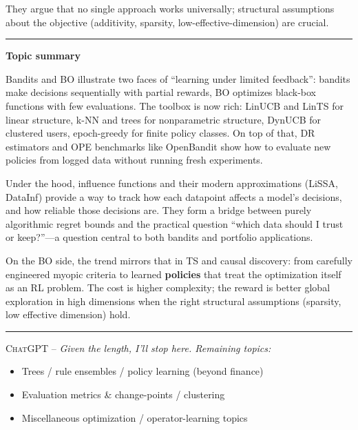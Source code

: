 \documentclass[a5paper]{article}
\providecommand{\tightlist}{%
  \setlength{\itemsep}{0pt}\setlength{\parskip}{0pt}}
\def\subsection#1{{\par\bigskip\goodbreak\large\bfseries #1\par}}
\begin{document}
They argue that no single approach works universally; structural
assumptions about the objective (additivity, sparsity,
low-effective-dimension) are crucial.

\begin{center}\rule{0.5\linewidth}{0.5pt}\end{center}

\subsection{Topic summary}\label{topic-summary-11}

Bandits and BO illustrate two faces of ``learning under limited
feedback'': bandits make decisions sequentially with partial rewards, BO
optimizes black-box functions with few evaluations. The toolbox is now
rich: LinUCB and LinTS for linear structure, k-NN and trees for
nonparametric structure, DynUCB for clustered users, epoch-greedy for
finite policy classes. On top of that, DR estimators and OPE benchmarks
like OpenBandit show how to evaluate new policies from logged data
without running fresh experiments.

Under the hood, influence functions and their modern approximations
(LiSSA, DataInf) provide a way to track how each datapoint affects a
model's decisions, and how reliable those decisions are. They form a
bridge between purely algorithmic regret bounds and the practical
question ``which data should I trust or keep?''---a question central to
both bandits and portfolio applications.

On the BO side, the trend mirrors that in TS and causal discovery: from
carefully engineered myopic criteria to learned \textbf{policies} that
treat the optimization itself as an RL problem. The cost is higher
complexity; the reward is better global exploration in high dimensions
when the right structural assumptions (sparsity, low effective
dimension) hold.

\begin{center}\rule{0.5\linewidth}{0.5pt}\end{center}

\textsc{ChatGPT --}
\itshape
Given the length, I'll stop here. Remaining topics:

\begin{itemize}
\tightlist
\item
  Trees / rule ensembles / policy learning (beyond finance)
\item
  Evaluation metrics \& change-points / clustering
\item
  Miscellaneous optimization / operator-learning topics
\end{itemize}
\end{document}
